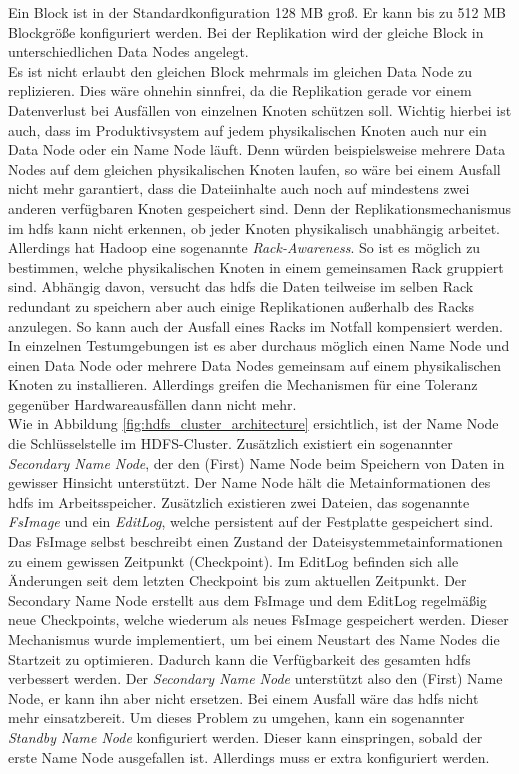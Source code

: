 \noindent
Ein Block ist in der Standardkonfiguration 128 MB groß. Er kann bis zu 512 MB Blockgröße konfiguriert werden. Bei der Replikation wird der gleiche Block in unterschiedlichen Data Nodes angelegt.\\
Es ist nicht erlaubt den gleichen Block mehrmals im gleichen Data Node zu replizieren. Dies wäre ohnehin sinnfrei, da die Replikation gerade vor einem Datenverlust bei Ausfällen von einzelnen Knoten schützen soll. Wichtig hierbei ist auch, dass im Produktivsystem auf jedem physikalischen Knoten auch nur ein Data Node oder ein Name Node läuft. Denn würden beispielsweise mehrere Data Nodes auf dem gleichen physikalischen Knoten laufen, so wäre bei einem Ausfall nicht mehr garantiert, dass die Dateiinhalte auch noch auf mindestens zwei anderen verfügbaren Knoten gespeichert sind. Denn der Replikationsmechanismus im \gls{hdfs} kann nicht erkennen, ob jeder Knoten physikalisch unabhängig arbeitet. Allerdings hat Hadoop eine sogenannte \textit{Rack-Awareness}. So ist es möglich zu bestimmen, welche physikalischen Knoten in einem gemeinsamen Rack gruppiert sind. Abhängig davon, versucht das \gls{hdfs} die Daten teilweise im selben Rack redundant zu speichern aber auch einige Replikationen außerhalb des Racks anzulegen. So kann auch der Ausfall eines Racks im Notfall kompensiert werden.\\
In einzelnen Testumgebungen ist es aber durchaus möglich einen Name Node und einen Data Node oder mehrere Data Nodes gemeinsam auf einem physikalischen Knoten zu installieren. Allerdings greifen die Mechanismen für eine Toleranz gegenüber Hardwareausfällen dann nicht mehr.\\

\noindent
Wie in Abbildung \ref{fig:hdfs_cluster_architecture} ersichtlich, ist der Name Node die Schlüsselstelle im HDFS-Cluster. Zusätzlich existiert ein sogenannter \textit{Secondary Name Node}, der den (First) Name Node beim Speichern von Daten in gewisser Hinsicht unterstützt. Der Name Node hält die Metainformationen des \gls{hdfs} im Arbeitsspeicher. Zusätzlich existieren zwei Dateien, das sogenannte \textit{FsImage} und ein \textit{EditLog}, welche persistent auf der Festplatte gespeichert sind. Das FsImage selbst beschreibt einen Zustand der Dateisystemmetainformationen zu einem gewissen Zeitpunkt (Checkpoint). Im EditLog befinden sich alle Änderungen seit dem letzten Checkpoint bis zum aktuellen Zeitpunkt. Der Secondary Name Node erstellt aus dem FsImage und dem EditLog regelmäßig neue Checkpoints, welche wiederum als neues FsImage gespeichert werden.
Dieser Mechanismus wurde implementiert, um bei einem Neustart des Name Nodes die Startzeit zu optimieren. Dadurch kann die Verfügbarkeit des gesamten \gls{hdfs}  verbessert werden. Der \textit{Secondary Name Node} unterstützt also den (First) Name Node, er kann ihn aber nicht ersetzen. Bei einem Ausfall wäre das \gls{hdfs} nicht mehr einsatzbereit. Um dieses Problem zu umgehen, kann ein sogenannter \textit{Standby Name Node} konfiguriert werden. Dieser kann einspringen, sobald der erste Name Node ausgefallen ist. Allerdings muss er extra konfiguriert werden.\cite[S. 40 ff.]{expert_hadoop_admin}\\

